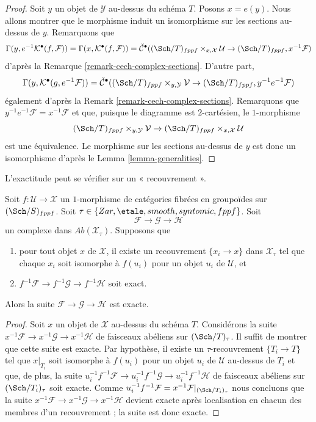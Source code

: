 \begin{proof}
Soit $y$ un objet de $\mathcal{Y}$ au-dessus du schéma $T$.
Posons $x = e(y)$. Nous allons montrer que le morphisme induit un isomorphisme
sur les sections au-dessus de $y$. Remarquons que
$$
\Gamma(y, e^{-1}\mathcal{K}^\bullet(f, \mathcal{F})) =
\Gamma(x, \mathcal{K}^\bullet(f, \mathcal{F})) =
\check{\mathcal{C}}^\bullet(
(\Sch/T)_{fppf} \times_{x, \mathcal{X}} \mathcal{U} \to
(\Sch/T)_{fppf}, x^{-1}\mathcal{F})
$$
d'après la
Remarque \ref{remark-cech-complex-sections}. D'autre part,
$$
\Gamma(y, \mathcal{K}^\bullet(g, e^{-1}\mathcal{F})) =
\check{\mathcal{C}}^\bullet(
(\Sch/T)_{fppf} \times_{y, \mathcal{Y}} \mathcal{V} \to
(\Sch/T)_{fppf}, y^{-1}e^{-1}\mathcal{F})
$$
également d'après la
Remark \ref{remark-cech-complex-sections}.
Remarquons que $y^{-1}e^{-1}\mathcal{F} = x^{-1}\mathcal{F}$
et que, puisque le diagramme est $2$-cartésien, le $1$-morphisme
$$
(\Sch/T)_{fppf} \times_{y, \mathcal{Y}} \mathcal{V} \to
(\Sch/T)_{fppf} \times_{x, \mathcal{X}} \mathcal{U}
$$
est une équivalence. Le morphisme sur les sections au-dessus de $y$ est donc un
isomorphisme d'après le
Lemma \ref{lemma-generalities}.
\end{proof}

\noindent
L'exactitude peut se vérifier sur un « recouvrement ».

\begin{lemma}
\label{lemma-check-exactness-covering}
Soit $f : \mathcal{U} \to \mathcal{X}$ un $1$-morphisme de catégories fibrées
en groupoïdes sur $(\Sch/S)_{fppf}$. Soit
$\tau \in \{Zar, \etale, smooth, syntomic, fppf\}$.
Soit
$$
\mathcal{F} \to \mathcal{G} \to \mathcal{H}
$$
un complexe dans $\textit{Ab}(\mathcal{X}_\tau)$. Supposons que
\begin{enumerate}
\item pour tout objet $x$ de $\mathcal{X}$, il existe un recouvrement
$\{x_i \to x\}$ dans $\mathcal{X}_\tau$ tel que chaque $x_i$ soit isomorphe
à $f(u_i)$ pour un objet $u_i$ de $\mathcal{U}$, et
\item $f^{-1}\mathcal{F} \to f^{-1}\mathcal{G} \to f^{-1}\mathcal{H}$ soit exact.
\end{enumerate}
Alors la suite $\mathcal{F} \to \mathcal{G} \to \mathcal{H}$
est exacte.
\end{lemma}

\begin{proof}
Soit $x$ un objet de $\mathcal{X}$ au-dessus du schéma $T$.
Considérons la suite
$x^{-1}\mathcal{F} \to x^{-1}\mathcal{G} \to x^{-1}\mathcal{H}$
de faisceaux abéliens sur $(\Sch/T)_\tau$. Il suffit de montrer
que cette suite est exacte. Par hypothèse, il existe un $\tau$-recouvrement
$\{T_i \to T\}$ tel que $x|_{T_i}$ soit isomorphe à $f(u_i)$ pour
un objet $u_i$ de $\mathcal{U}$ au-dessus de $T_i$ et que, de plus, la suite
$u_i^{-1}f^{-1}\mathcal{F} \to u_i^{-1}f^{-1}\mathcal{G} \to
u_i^{-1}f^{-1}\mathcal{H}$ de faisceaux abéliens sur $(\Sch/T_i)_\tau$
soit exacte. Comme
$u_i^{-1}f^{-1}\mathcal{F} = x^{-1}\mathcal{F}|_{(\Sch/T_i)_\tau}$
nous concluons que la suite
$x^{-1}\mathcal{F} \to x^{-1}\mathcal{G} \to x^{-1}\mathcal{H}$
devient exacte après localisation en chacun des membres d'un recouvrement ;
la suite est donc exacte.
\end{proof}

